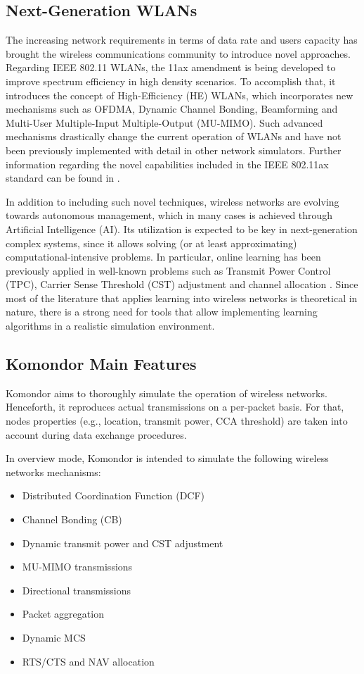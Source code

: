 \documentclass[a4paper]{article}
\begin{document}
	\subsection{Next-Generation WLANs}
	\label{section:ng_wlans}
	The increasing network requirements in terms of data rate and users capacity has brought the wireless communications community to introduce novel approaches. Regarding IEEE 802.11 WLANs, the 11ax amendment is being developed to improve spectrum efficiency in high density scenarios. To accomplish that, it introduces the concept of High-Efficiency (HE) WLANs, which incorporates new mechanisms such as OFDMA, Dynamic Channel Bonding, Beamforming and Multi-User Multiple-Input Multiple-Output (MU-MIMO). Such advanced mechanisms drastically change the current operation of WLANs and have not been previously implemented with detail in other network simulators. Further information regarding the novel capabilities included in the IEEE 802.11ax standard can be found in \cite{bellalta2016ieee}.
	
	In addition to including such novel techniques, wireless networks are evolving towards autonomous management, which in many cases is achieved through Artificial Intelligence (AI). Its utilization is expected to be key in next-generation complex systems, since it allows solving (or at least approximating) computational-intensive problems. In particular, online learning has been previously applied in well-known problems such as Transmit Power Control (TPC), Carrier Sense Threshold (CST) adjustment and channel allocation \cite{wilhelmi2017implications, wilhelmi2017collaborative, maghsudi2015joint, maghsudi2015channel}. Since most of the literature that applies learning into wireless networks is theoretical in nature, there is a strong need for tools that allow implementing learning algorithms in a realistic simulation environment.	
	
	\subsection{Komondor Main Features}
	\label{section:features}
	Komondor aims to thoroughly simulate the operation of wireless networks. Henceforth, it reproduces actual transmissions on a per-packet basis. For that, nodes properties (e.g., location, transmit power, CCA threshold) are taken into account during data exchange procedures.
	
	In overview mode, Komondor is intended to simulate the following wireless networks mechanisms:
	\begin{itemize}
		\item Distributed Coordination Function (DCF)
		\item Channel Bonding (CB)
		\item Dynamic transmit power and CST adjustment
		\item MU-MIMO transmissions
		\item Directional transmissions
		\item Packet aggregation
		\item Dynamic MCS
		\item RTS/CTS and NAV allocation
	\end{itemize}
\end{document}
